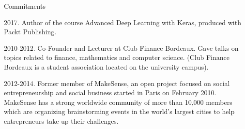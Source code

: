 \documentclass{resume} %
\begin{document}
\begin{rSection}{Commitments}

2017. Author of the course Advanced Deep Learning with Keras, produced with Packt Publishing.

2010-2012. Co-Founder and Lecturer at Club Finance Bordeaux. Gave talks on topics related to finance, mathematics and computer science. (Club Finance Bordeaux is a student association located on the university campus).

2012-2014. Former member of MakeSense, an open project focused on social entrepreneurship and social business started in Paris on February 2010. MakeSense has a strong worldwide community of more than 10,000 members which are organizing brainstorming events in the world’s largest cities to help entrepreneurs take up their challenges.


\end{rSection}





\end{document}
